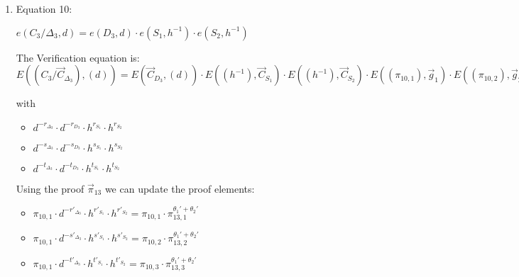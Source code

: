 \begin{description}
\begin{enumerate}
\begin{enumerate}
      \begin{itemize}
      \item[$\pi'_{9,1} = $] $\pi_{9,1} \cdot d^{-r'_{\Delta_2}} \cdot f^{-r'_{S_2}} = \pi_{9,1} \cdot \pi_{15,1}^{-\theta_2'}$
      \item[$\pi'_{9,2} = $] $\pi_{9,2} \cdot d^{-s'_{\Delta_2}} \cdot f^{-s'_{S_2}} = \pi_{9,2} \cdot \pi_{15,2}^{-\theta_2'}$
      \item[$\pi'_{9,3} = $] $\pi_{9,3} \cdot d^{-t'_{\Delta_2}} \cdot f^{-t'_{S_2}} = \pi_{9,3} \cdot \pi_{15,3}^{-\theta_2'}$
      \end{itemize}

    \item Equation 10:

      $e(C_3/\boxed{\Delta_3}, d) = e (\boxed{D_3},d) \cdot e(\boxed{S_1}, h^{-1})\cdot e(\boxed{S_2}, h^{-1})$

      The Verification equation is: $ E((C_3/\vec{C}_{\Delta_3}), (d)) = E(\vec{C}_{D_3},(d)) \cdot E((h^{-1}), \vec{C}_{S_1}) \cdot E((h^{-1}), \vec{C}_{S_2}) \cdot E((\pi_{10,1}), \vec{g}_1)\cdot E((\pi_{10,2}), \vec{g}_2)\cdot E((\pi_{10,3}), \vec{g}_3)$

      with
      \begin{itemize}
      \item[$\pi_{10,1} = $] $d^{-r_{\Delta_3}} \cdot d^{-r_{D_3}} \cdot h^{r_{S_1}} \cdot h^{r_{S_2}}$
      \item[$\pi_{10,2} = $] $d^{-s_{\Delta_3}} \cdot d^{-s_{D_3}} \cdot h^{s_{S_1}} \cdot h^{s_{S_2}}$
      \item[$\pi_{10,3} = $] $d^{-t_{\Delta_3}} \cdot d^{-t_{D_3}} \cdot h^{t_{S_1}} \cdot h^{t_{S_2}}$
      \end{itemize}

      Using the proof $\vec{\pi}_{13}$ we can update the proof elements:

      \begin{itemize}
      \item[$\pi'_{10,1} = $] $\pi_{10,1} \cdot d^{-r'_{\Delta_3}} \cdot h^{r'_{S_1}} \cdot h^{r'_{S_2}} = \pi_{10,1} \cdot \pi_{13,1}^{\theta_1'+\theta_2'}$
      \item[$\pi'_{10,2} = $] $\pi_{10,1} \cdot d^{-s'_{\Delta_3}} \cdot h^{s'_{S_1}} \cdot h^{s'_{S_2}} = \pi_{10,2} \cdot \pi_{13,2}^{\theta_1'+\theta_2'}$
      \item[$\pi'_{10,3} = $] $\pi_{10,1} \cdot d^{-t'_{\Delta_3}} \cdot h^{t'_{S_1}} \cdot h^{t'_{S_2}} = \pi_{10,3} \cdot \pi_{13,3}^{\theta_1'+\theta_2'}$
      \end{itemize}
      

\end{enumerate}
\end{enumerate}
\end{description}
